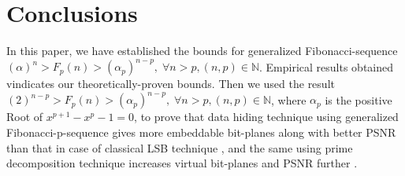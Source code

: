 \documentclass{ijcsa}
\begin{document}
\section{Conclusions}
In this paper, we have established the bounds for generalized Fibonacci-sequence $(\alpha)^{n} > F_{p}(n) > (\alpha_{p})^{n-p}, \; \forall{n}>p, (n,p) \in \mathbb{N}$. Empirical results obtained vindicates our theoretically-proven bounds. Then we used the 
result $(2)^{n-p} > F_{p}(n) > (\alpha_{p})^{n-p}, \; \forall{n}>p, (n,p) \in \mathbb{N} $, where 
$\alpha_{p}$ is the positive Root of $x^{p+1}-x^{p}-1=0$, to prove that data hiding technique using generalized 
Fibonacci-p-sequence gives more embeddable bit-planes along with better PSNR than that in case of 
classical LSB technique \cite{dey08}, and the same using prime decomposition technique increases virtual bit-planes 
and PSNR further \cite{dey07a}. 
\end{document}
